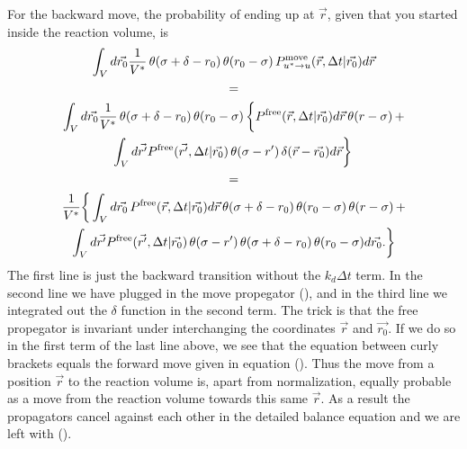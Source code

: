 For the backward move, the probability of ending up at $\vec{r}$, given that you started inside the reaction volume, is
\begin{multline}
\int_{V} d\vec{r_0} \frac{1}{V^*} \, \theta(\sigma + \delta - r_0) \, \theta(r_0 - \sigma) \, P^{\rm move}_{u^* \rightarrow u}(\vec{r},\Delta t|\vec{r_0})d\vec{r} 
\\ =
\\ \int_{V} d\vec{r_0} \frac{1}{V^*} \, \theta(\sigma + \delta - r_0) \, \theta(r_0 - \sigma) \, \bigg\{ P^{\rm free}(\vec{r},\Delta t|\vec{r_0}) d\vec{r} \, \theta(r - \sigma) \, + 
\\ \int_{V} d\vec{r'} P^{\rm free}(\vec{r'},\Delta t|\vec{r_0}) \, \theta(\sigma - r') \, \delta(\vec{r} - \vec{r_0}) d\vec{r} \bigg\} \, 
\\ = 
\\ \frac{1}{V^*} \bigg\{ \int_{V} d\vec{r_0} \, P^{\rm free}(\vec{r},\Delta t|\vec{r_0}) d\vec{r} \, \theta(\sigma + \delta - r_0) \, \theta(r_0 - \sigma) \, \theta(r - \sigma) \, + 
\\ \int_{V} d\vec{r'} P^{\rm free}(\vec{r'},\Delta t|\vec{r_0}) \, \theta(\sigma - r') \, \theta(\sigma + \delta - r_0)  \, \theta(r_0 - \sigma) d\vec{r_0}. \bigg\}
\end{multline}
The first line is just the backward transition without the $k_d \Delta t$ term. In the second line we have plugged in the move propegator (), and in the third line we integrated out the $\delta$ function in the second term. The trick is that the free propegator is invariant under interchanging the coordinates $\vec{r}$ and $\vec{r_0}$. If we do so in the first term of the last line above, we see that the equation between curly brackets equals the forward move given in equation (). Thus the move from a position $\vec{r}$ to the reaction volume is, apart from normalization, equally probable as a move from the reaction volume towards this same $\vec{r}$. As a result the propagators cancel against each other in the detailed balance equation and we are left with ().